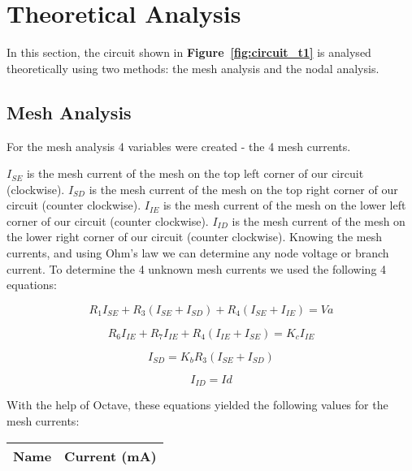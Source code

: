 \section{Theoretical Analysis}
\label{sec:analysis}

In this section, the circuit shown in \textbf{Figure~\ref{fig:circuit_t1}} is analysed
theoretically using two methods: the mesh analysis and the nodal analysis.\par

\subsection{Mesh Analysis} 
For the mesh analysis 4 variables were created - the 4 mesh currents.\par
{\it$I_{SE}$ } is the mesh current of the mesh on the top left corner of our circuit (clockwise). {\it$I_{SD}$} is the mesh current of the mesh on the top right corner of our circuit (counter clockwise). {\it$I_{IE}$ } is the mesh current of the mesh on the lower left corner of our circuit (counter clockwise). {\it$I_{ID}$} is the mesh current of the mesh on the lower right corner of our circuit (counter clockwise). Knowing the mesh currents, and using Ohm's law we can determine any node voltage or branch current. To determine the 4 unknown mesh currents we used the following 4 equations:


\begin {equation}
	R_1I_{SE} + R_3(I_{SE}+I_{SD}) + R_4(I_{SE}+I_{IE}) = Va
	\label{eq:m1}
\end{equation}

\begin {equation}
	R_6I_{IE} + R_7I_{IE} + R_4(I_{IE}+I_{SE}) = K_cI_{IE}
	\label{eq:m2}
\end{equation}

\begin {equation}
	I_{SD} = K_bR_3(I_{SE}+I_{SD})
	\label{eq:m3}
\end{equation}

\begin {equation}
	I_{ID} = Id
	\label{eq:m4}
\end{equation}

With the help of Octave, these equations yielded the following values for the mesh currents:\par

\begin{table}[h]
  \centering
  \begin{tabular}{|l|r|}
    \hline    
    {\bf Name} & {\bf Current (mA)}\\ \hline
    
  \end{tabular}
  \label{tab:theoretical_curr}
\end{table}

